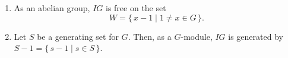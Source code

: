 \begin{lemma}[1.2]
\leavevmode
\begin{enumerate}
  \item[(i)] As an abelian group, $IG$ is free on the set
    $$W = \{\,x - 1 \mid 1 \neq x \in G\,\}.$$
  \item[(ii)] Let $S$ be a generating set for $G$. Then, as a $G$-module, $IG$ is generated by $S - 1 = \{\,s - 1 \mid s \in S\,\}$.
\end{enumerate}
\end{lemma}

